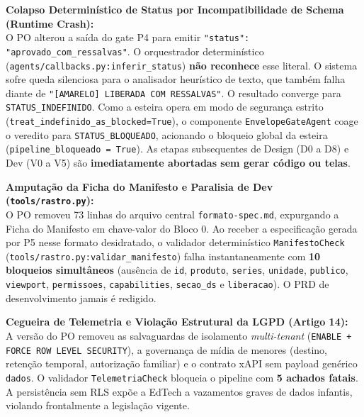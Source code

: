 \documentclass[11pt,a4paper]{article}
\begin{document}
\begin{enumerate}[label=\textbf{\color{DarkRed}[\arabic*]}]
    \item \textbf{Colapso Determinístico de Status por Incompatibilidade de Schema (Runtime Crash):}\\
    O PO alterou a saída do gate P4 para emitir \texttt{"status": "aprovado\_com\_ressalvas"}. O orquestrador determinístico (\texttt{agents/callbacks.py:inferir\_status}) \textbf{não reconhece} esse literal. O sistema sofre queda silenciosa para o analisador heurístico de texto, que também falha diante de \texttt{"[AMARELO] LIBERADA COM RESSALVAS"}. O resultado converge para \texttt{STATUS\_INDEFINIDO}. Como a esteira opera em modo de segurança estrito (\texttt{treat\_indefinido\_as\_blocked=True}), o componente \texttt{EnvelopeGateAgent} coage o veredito para \texttt{STATUS\_BLOQUEADO}, acionando o bloqueio global da esteira (\texttt{pipeline\_bloqueado = True}). As etapas subsequentes de Design (D0 a D8) e Dev (V0 a V5) são \textbf{imediatamente abortadas sem gerar código ou telas}.
    
    \item \textbf{Amputação da Ficha do Manifesto e Paralisia de Dev (\texttt{tools/rastro.py}):}\\
    O PO removeu 73 linhas do arquivo central \texttt{formato-spec.md}, expurgando a Ficha do Manifesto em chave-valor do Bloco 0. Ao receber a especificação gerada por P5 nesse formato desidratado, o validador determinístico \texttt{ManifestoCheck} (\texttt{tools/rastro.py:validar\_manifesto}) falha instantaneamente com \textbf{10 bloqueios simultâneos} (ausência de \texttt{id}, \texttt{produto}, \texttt{series}, \texttt{unidade}, \texttt{publico}, \texttt{viewport}, \texttt{permissoes}, \texttt{capabilities}, \texttt{secao\_ds} e \texttt{liberacao}). O PRD de desenvolvimento jamais é redigido.
    
    \item \textbf{Cegueira de Telemetria e Violação Estrutural da LGPD (Artigo 14):}\\
    A versão do PO removeu as salvaguardas de isolamento \textit{multi-tenant} (\texttt{ENABLE + FORCE ROW LEVEL SECURITY}), a governança de mídia de menores (destino, retenção temporal, autorização familiar) e o contrato xAPI sem payload genérico \texttt{dados}. O validador \texttt{TelemetriaCheck} bloqueia o pipeline com \textbf{5 achados fatais}. A persistência sem RLS expõe a EdTech a vazamentos graves de dados infantis, violando frontalmente a legislação vigente.
\end{enumerate}
\end{document}
